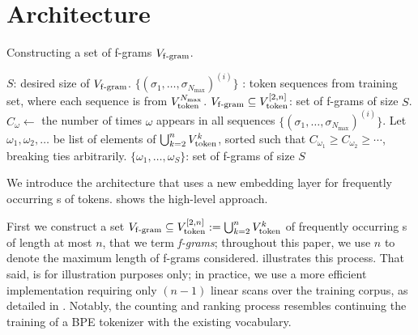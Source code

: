 \section{\SCONE Architecture}
\label{sec:method}

\begin{algorithm}[t]
\caption{Constructing a set of f-grams $V_{\mathrm{f\text{-}gram}}$.}
\label{alg:n-gram-vocab}
\begin{algorithmic}
 $S$: desired size of $V_{\mathrm{f\text{-}gram}}$.
 $\{(\sigma_1, \ldots, \sigma_{N_{\max}})^{(i)}\}$ : token sequences from training set, where each sequence is from $V_{\mathrm{token}}^{N_{\max}}$.
 $V_{\mathrm{f\text{-}gram}} \subseteq V_{\mathrm{token}}^{[2,n]}$: set of f-grams of size $S$.
        \STATE $C_{\omega} \gets$ the number of times $\omega$ appears in all sequences $\{(\sigma_1, \ldots, \sigma_{N_{\max}})^{(i)}\}$.
    \ENDFOR
\ENDFOR
\STATE Let $\omega_1, \omega_2, \ldots $ be list of elements of $\bigcup_{k=2}^n V_{\mathrm{token}}^{k}$, sorted such that $C_{\omega_1} \ge C_{\omega_2} \ge \cdots$, breaking ties arbitrarily.
\RETURN $\{\omega_1, \ldots, \omega_{S}\}$: set of f-grams of size $S$ 
\end{algorithmic}
\end{algorithm}

We introduce the \SCONE architecture that uses a new embedding layer for frequently occurring s of tokens.  shows the high-level approach.

First we construct a set $V_{\mathrm{f\text{-}gram}} \subseteq V_{\mathrm{token}}^{[2, n]} := \bigcup_{k=2}^n V_{\mathrm{token}}^{k}$ of frequently occurring s of length at most $n$, that we term {\em f-grams}; throughout this paper, we use $n$ to denote the maximum length of f-grams considered.  illustrates this process. That said,  is for illustration purposes only; in practice, we use a more efficient implementation requiring only $(n-1)$ linear scans over the training corpus, as detailed in . Notably, the counting and ranking process resembles continuing the training of a BPE tokenizer \citep{sennrich2015neural} with the existing vocabulary.

